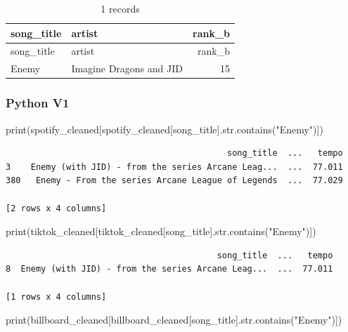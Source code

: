 \documentclass[
  letterpaper,
  DIV=11,
  numbers=noendperiod]{scrreprt}
\newenvironment{Shaded}{\begin{snugshade}}{\end{snugshade}}
\newcommand{\BuiltInTok}[1]{\textcolor[rgb]{0.00,0.23,0.31}{#1}}
\newcommand{\NormalTok}[1]{\textcolor[rgb]{0.00,0.23,0.31}{#1}}
\newcommand{\StringTok}[1]{\textcolor[rgb]{0.13,0.47,0.30}{#1}}
\begin{document}
\begin{longtable}[]{@{}llr@{}}
\caption{1 records}\tabularnewline
\toprule\noalign{}
song\_title & artist & rank\_b \\
\midrule\noalign{}
\endfirsthead
\toprule\noalign{}
song\_title & artist & rank\_b \\
\midrule\noalign{}
\endhead
\bottomrule\noalign{}
\endlastfoot
Enemy & Imagine Dragons and JID & 15 \\
\end{longtable}

\subsubsection{Python V1}

\begin{Shaded}
\begin{Highlighting}[]
\BuiltInTok{print}\NormalTok{(spotify\_cleaned[spotify\_cleaned[}\StringTok{\textquotesingle{}song\_title\textquotesingle{}}\NormalTok{].}\BuiltInTok{str}\NormalTok{.contains(}\StringTok{"Enemy"}\NormalTok{)])}
\end{Highlighting}
\end{Shaded}

\begin{verbatim}
                                            song_title  ...   tempo
3    Enemy (with JID) - from the series Arcane Leag...  ...  77.011
380   Enemy - From the series Arcane League of Legends  ...  77.029

[2 rows x 4 columns]
\end{verbatim}

\begin{Shaded}
\begin{Highlighting}[]
\BuiltInTok{print}\NormalTok{(tiktok\_cleaned[tiktok\_cleaned[}\StringTok{\textquotesingle{}song\_title\textquotesingle{}}\NormalTok{].}\BuiltInTok{str}\NormalTok{.contains(}\StringTok{"Enemy"}\NormalTok{)])}
\end{Highlighting}
\end{Shaded}

\begin{verbatim}
                                          song_title  ...   tempo
8  Enemy (with JID) - from the series Arcane Leag...  ...  77.011

[1 rows x 4 columns]
\end{verbatim}

\begin{Shaded}
\begin{Highlighting}[]
\BuiltInTok{print}\NormalTok{(billboard\_cleaned[billboard\_cleaned[}\StringTok{\textquotesingle{}song\_title\textquotesingle{}}\NormalTok{].}\BuiltInTok{str}\NormalTok{.contains(}\StringTok{"Enemy"}\NormalTok{)])}
\end{Highlighting}
\end{Shaded}
\end{document}
